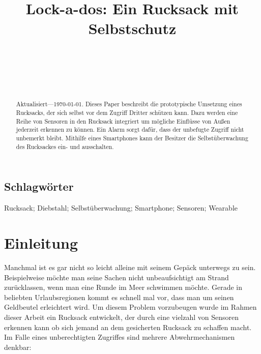 \documentclass{sigchi}
\def\plaintitle{Lock-a-dos: Ein Rucksack mit Selbstschutz}
\def\plainkeywords{Rucksack; Diebstahl; Selbstüberwachung; Smartphone; Sensoren; Wearable}
\begin{document}
\title{\plaintitle}

\author{%
  \\
  \\
  \\
  \\
}

\maketitle

\begin{abstract}
  Aktualisiert---\today. Dieses Paper beschreibt die prototypische
  Umsetzung eines Rucksacks, der sich selbst vor dem Zugriff Dritter
  schützen kann. Dazu werden eine Reihe von Sensoren in den Rucksack
  integriert um mögliche Einflüsse von Außen jederzeit erkennen zu
  können. Ein Alarm sorgt dafür, dass der unbefugte Zugriff nicht
  unbemerkt bleibt. Mithilfe eines Smartphones kann der Besitzer
  die Selbstüberwachung des Rucksackes ein- und ausschalten.
\end{abstract}

\subsection{Schlagwörter}
\plainkeywords

\section{Einleitung}
Manchmal ist es gar nicht so leicht alleine mit seinem Gepäck
unterwegs zu sein. Beispielweise möchte man seine Sachen nicht 
unbeaufsichtigt am Strand zurücklassen, wenn man eine Runde
im Meer schwimmen möchte. Gerade in beliebten Urlaubsregionen
kommt es schnell mal vor, dass man um seinen Geldbeutel 
erleichtert wird. Um diesem Problem vorzubeugen wurde im Rahmen
dieser Arbeit ein Rucksack entwickelt, der durch eine vielzahl
von Sensoren erkennen kann ob sich jemand an dem gesicherten
Rucksack zu schaffen macht. Im Falle eines unberechtigten 
Zugriffes sind mehrere Abwehrmechanismen denkbar:
\end{document}

